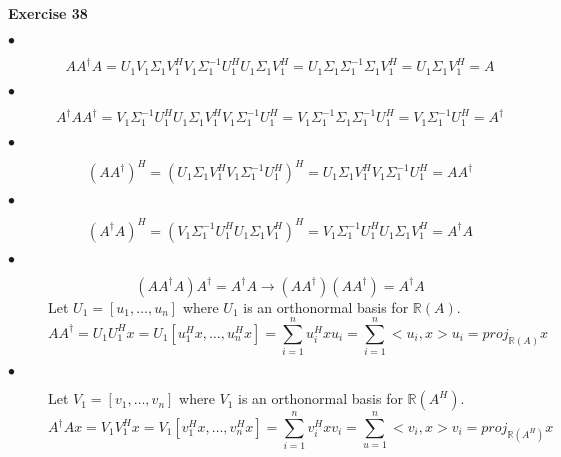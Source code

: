 \documentclass[letterpaper,12pt]{article}
\theoremstyle{definition}
\begin{document}
\noindent\textbf{Exercise 38} 
\begin{description}
\item [$\bullet$] \[AA^\dagger A = U_1V_1\Sigma_1V_1^HV_1\Sigma_1^{-1}U_1^HU_1\Sigma_1V_1^H = U_1\Sigma_1\Sigma_1^{-1}\Sigma_1V_1^H = U_1\Sigma_1V_1^H = A\]
\item [$\bullet$] \[A^\dagger AA^\dagger = V_1\Sigma_1^{-1}U_1^HU_1\Sigma_1V_1^HV_1\Sigma_1^{-1}U_1^H = V_1\Sigma_1^{-1}\Sigma_1\Sigma_1^{-1}U_1^H = V_1\Sigma_1^{-1}U_1^H = A^\dagger\]
\item [$\bullet$] \[(AA^\dagger)^H =(U_1\Sigma_1V_1^HV_1\Sigma_1^{-1}U_1^H)^H = U_1\Sigma_1V_1^HV_1\Sigma_1^{-1}U_1^H = AA^\dagger\] 
\item [$\bullet$] \[(A^\dagger A)^H = (V_1\Sigma_1^{-1}U_1^HU_1\Sigma_1V_1^H)^H =V_1\Sigma_1^{-1}U_1^HU_1\Sigma_1V_1^H = A^\dagger A \]
\item [$\bullet$] \[(AA^\dagger A)A^\dagger = A^\dagger A \rightarrow (AA^\dagger)(AA^\dagger) = A^\dagger A\]
Let $ U_1 = [u_1, \dots , u_n] $ where $U_1$ is an orthonormal basis for $\mathbb{R}(A)$.
\[AA^\dagger = U_1U_1^Hx = U_1[u_1^Hx, \dots , u_n^Hx] = \sum_{i=1}^n u_i^Hxu_i = \sum_{i=1}^n <u_i, x>u_i = proj_{\mathbb{R}(A)} x\]
\item [$\bullet$] Let $V_1 = [v_1, \dots , v_n] $ where $V_1$ is an orthonormal basis for $\mathbb{R}(A^H)$.
\[A^\dagger Ax = V_1V_1^Hx = V_1[v_1^Hx, \dots , v_n^Hx] = \sum_{i=1}^n v_i^Hxv_i = \sum_{u=1}^n <v_i, x>v_i = proj_{\mathbb{R}(A^H)}x\]
\end{description}
\end{document}
